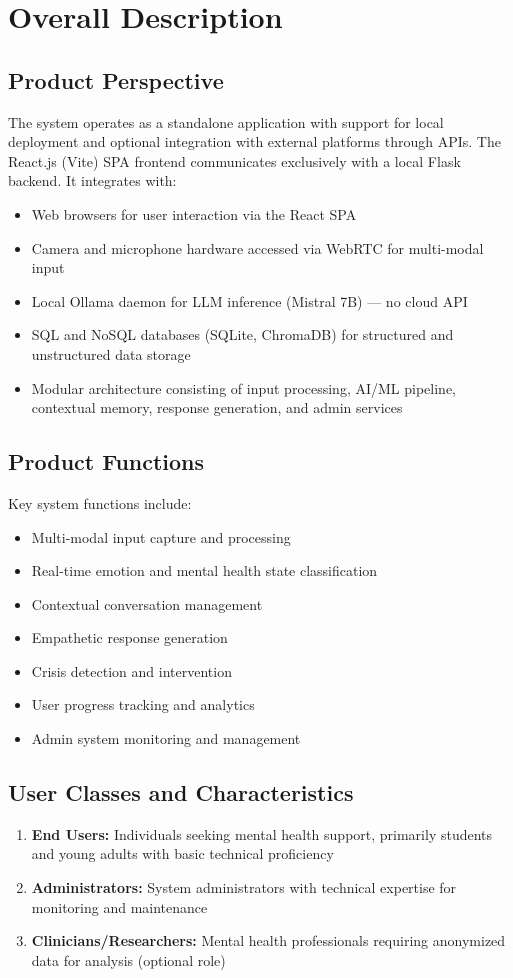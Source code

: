 \documentclass[11pt]{report}
\begin{document}
\section{Overall Description}

\subsection{Product Perspective}
The system operates as a standalone application with support for local deployment and optional integration with external platforms through APIs. The React.js (Vite) SPA frontend communicates exclusively with a local Flask backend. It integrates with:
\begin{itemize}
    \item Web browsers for user interaction via the React SPA
    \item Camera and microphone hardware accessed via WebRTC for multi-modal input
    \item Local Ollama daemon for LLM inference (Mistral 7B) — no cloud API
    \item SQL and NoSQL databases (SQLite, ChromaDB) for structured and unstructured data storage
    \item Modular architecture consisting of input processing, AI/ML pipeline, contextual memory, response generation, and admin services
\end{itemize}

\subsection{Product Functions}
Key system functions include:
\begin{itemize}
    \item Multi-modal input capture and processing
    \item Real-time emotion and mental health state classification
    \item Contextual conversation management
    \item Empathetic response generation
    \item Crisis detection and intervention
    \item User progress tracking and analytics
    \item Admin system monitoring and management
\end{itemize}

\subsection{User Classes and Characteristics}
\begin{enumerate}
    \item \textbf{End Users:} Individuals seeking mental health support, primarily students and young adults with basic technical proficiency
    \item \textbf{Administrators:} System administrators with technical expertise for monitoring and maintenance
    \item \textbf{Clinicians/Researchers:} Mental health professionals requiring anonymized data for analysis (optional role)
\end{enumerate}
\end{document}
